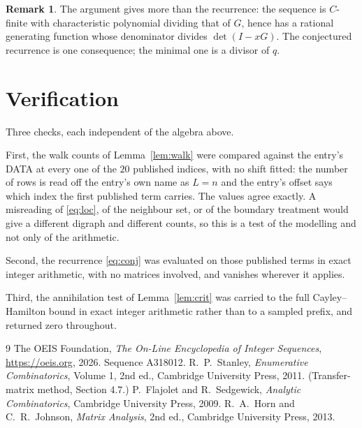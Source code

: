\documentclass[11pt,a4paper]{article}
\theoremstyle{plain}
\theoremstyle{definition}
\newtheorem{remark}[theorem]{Remark}
\begin{document}
\begin{remark}
The argument gives more than the recurrence: the sequence is $C$-finite with characteristic
polynomial dividing that of $G$, hence has a rational generating function whose denominator
divides $\det(I-xG)$. The conjectured recurrence is one consequence; the minimal one is a
divisor of $q$.
\end{remark}

\section{Verification}

Three checks, each independent of the algebra above.

First, the walk counts of Lemma~\ref{lem:walk} were compared against the entry's DATA at
every one of the $20$ published indices, with no shift fitted: the number of rows is
read off the entry's own name as $L=n$ and the entry's offset says which index the first
published term carries. The values agree exactly. A misreading of \eqref{eq:loc}, of the
neighbour set, or of the boundary treatment would give a different digraph and different
counts, so this is a test of the modelling and not only of the arithmetic.

Second, the recurrence \eqref{eq:conj} was evaluated on those published terms in exact
integer arithmetic, with no matrices involved, and vanishes wherever it applies.

Third, the annihilation test of Lemma~\ref{lem:crit} was carried to the full
Cayley--Hamilton bound in exact integer arithmetic rather than to a sampled prefix, and
returned zero throughout.

\begin{thebibliography}{9}
 The OEIS Foundation, \emph{The On-Line Encyclopedia of Integer
Sequences}, \url{https://oeis.org}, 2026. Sequence A318012.
 R.~P.~Stanley, \emph{Enumerative Combinatorics}, Volume 1, 2nd ed.,
Cambridge University Press, 2011. (Transfer-matrix method, Section 4.7.)
 P.~Flajolet and R.~Sedgewick, \emph{Analytic Combinatorics}, Cambridge
University Press, 2009.
 R.~A.~Horn and C.~R.~Johnson, \emph{Matrix Analysis}, 2nd ed., Cambridge
University Press, 2013.
\end{thebibliography}
\end{document}
